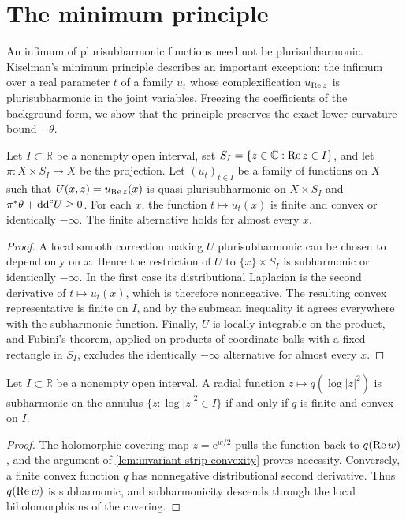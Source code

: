 \section{The minimum principle}
\label{sec:psh-minimum}

An infimum of plurisubharmonic functions need not be plurisubharmonic. Kiselman's minimum principle describes an important exception: the infimum over a real parameter $t$ of a family $u_t$ whose complexification $u_{\operatorname{Re} z}$ is plurisubharmonic in the joint variables. Freezing the coefficients of the background form, we show that the principle preserves the exact lower curvature bound $-\theta$.

\begin{lemma}\label{lem:invariant-strip-convexity}
Let $I\subset\mathbb R$ be a nonempty open interval, set $S_I=\{z\in\mathbb C:\operatorname{Re} z\in I\}$, and let $\pi\colon X\times S_I\to X$ be the projection. Let $(u_t)_{t\in I}$ be a family of functions on $X$ such that $U(x,z)=u_{\operatorname{Re} z}(x)$ is quasi-plurisubharmonic on $X\times S_I$ and $\pi^*\theta+\mathrm{dd}^{\mathrm{c}} U\geq0$. For each $x$, the function $t\mapsto u_t(x)$ is finite and convex or identically $-\infty$. The finite alternative holds for almost every $x$.
\end{lemma}
\begin{proof}
A local smooth correction making $U$ plurisubharmonic can be chosen to depend only on $x$. Hence the restriction of $U$ to $\{x\}\times S_I$ is subharmonic or identically $-\infty$. In the first case its distributional Laplacian is the second derivative of $t\mapsto u_t(x)$, which is therefore nonnegative. The resulting convex representative is finite on $I$, and by the submean inequality it agrees everywhere with the subharmonic function. Finally, $U$ is locally integrable on the product, and Fubini's theorem, applied on products of coordinate balls with a fixed rectangle in $S_I$, excludes the identically $-\infty$ alternative for almost every $x$.
\end{proof}

\begin{corollary}\label{cor:radial-subharmonic-convexity}
Let $I\subset\mathbb R$ be a nonempty open interval. A radial function $z\mapsto q(\log|z|^2)$ is subharmonic on the annulus $\{z:\log|z|^2\in I\}$ if and only if $q$ is finite and convex on $I$.
\end{corollary}
\begin{proof}
The holomorphic covering map $z=\mathrm{e}^{w/2}$ pulls the function back to $q(\operatorname{Re} w)$, and the argument of \cref{lem:invariant-strip-convexity} proves necessity. Conversely, a finite convex function $q$ has nonnegative distributional second derivative. Thus $q(\operatorname{Re} w)$ is subharmonic, and subharmonicity descends through the local biholomorphisms of the covering.
\end{proof}


